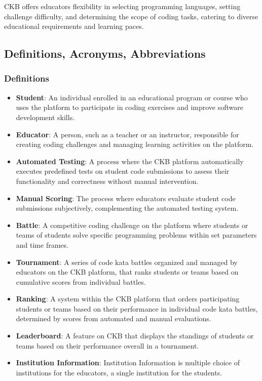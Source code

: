 CKB offers educators flexibility in selecting programming languages, setting challenge difficulty, and determining the scope of coding tasks, catering to diverse educational requirements and learning paces.


\subsection{Definitions, Acronyms, Abbreviations}
\subsubsection{Definitions}
\begin{itemize}
    \item \textbf{Student}: An individual enrolled in an educational program or course who uses the platform to participate in coding exercises and improve software development skills.
    \item \textbf{Educator}: A person, such as a teacher or an instructor, responsible for creating coding challenges and managing learning activities on the platform.
    \item \textbf{Automated Testing}: A process where the CKB platform automatically executes predefined tests on student code submissions to assess their functionality and correctness without manual intervention.
    \item \textbf{Manual Scoring}: The process where educators evaluate student code submissions subjectively, complementing the automated testing system.
    \item \textbf{Battle}: A competitive coding challenge on the platform where students or teams of students solve specific programming problems within set parameters and time frames.
    \item \textbf{Tournament}: A series of code kata battles organized and managed by educators on the CKB platform, that ranks students or teams based on cumulative scores from individual battles.
    \item \textbf{Ranking}: A system within the CKB platform that orders participating students or teams based on their performance in individual code kata battles, determined by scores from automated and manual evaluations.
    \item \textbf{Leaderboard}: A feature on CKB that displays the standings of students or teams based on their performance overall in a tournament.
    \item \textbf{Institution Information}: Institution Information is multiple choice of institutions for the educators, a single institution for the students.

\end{itemize}
